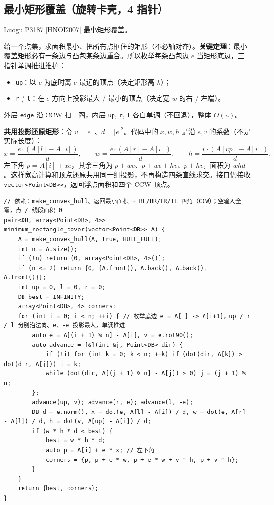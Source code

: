 		\subsection{最小矩形覆盖（旋转卡壳，4 指针）}

		\href{https://vjudge.net/problem/Luogu-P3187}{Luogu P3187 [HNOI2007] 最小矩形覆盖}。

		给一个点集，求面积最小、把所有点框住的矩形（不必轴对齐）。\textbf{关键定理}：最小覆盖矩形必有一条边与凸包某条边重合。所以枚举每条凸包边 $e$ 当矩形底边，三指针单调推进维护：
		\begin{itemize}
				\setlength\itemsep{0pt}
			\item \texttt{up}：以 $e$ 为底时离 $e$ 最远的顶点（决定矩形高 $h$）；
			\item \texttt{r} / \texttt{l}：在 $e$ 方向上投影最大 / 最小的顶点（决定宽 $w$ 的右 / 左端）。
		\end{itemize}
		外层 \texttt{edge} 沿 CCW 扫一圈，内层 \texttt{up}, \texttt{r}, \texttt{l} 各自单调（不回退），整体 $O(n)$。

		\textbf{共用投影还原矩形}：令 $v=e^\perp$、$d=|e|^2$。代码中的 $x,w,h$ 是沿 $e,v$ 的系数（不是实际长度）：
		\[
		 x=\frac{e\cdot(A[l]-A[i])}{d},\qquad
		 w=\frac{e\cdot(A[r]-A[l])}{d},\qquad
		 h=\frac{v\cdot(A[up]-A[i])}{d}.
		\]
		左下角 $p=A[i]+xe$，其余三角为 $p+we$、$p+we+hv$、$p+hv$，面积为 $whd$。这样宽高计算和顶点还原共用同一组投影，不再构造四条直线求交。接口仍接收 \texttt{vector<Point<DB>>}，返回浮点面积和四个 CCW 顶点。

\begin{verbatim}
// 依赖：make_convex_hull。返回最小面积 + BL/BR/TR/TL 四角（CCW）；空输入全零，点 / 线段面积 0
pair<DB, array<Point<DB>, 4>> minimum_rectangle_cover(vector<Point<DB>> A) {
	A = make_convex_hull(A, true, HULL_FULL);
	int n = A.size();
	if (!n) return {0, array<Point<DB>, 4>()};
	if (n <= 2) return {0, {A.front(), A.back(), A.back(), A.front()}};
	int up = 0, l = 0, r = 0;
	DB best = INFINITY;
	array<Point<DB>, 4> corners;
	for (int i = 0; i < n; ++i) { // 枚举底边 e = A[i] -> A[i+1]，up / r / l 分别沿法向、e、-e 投影最大，单调推进
		auto e = A[(i + 1) % n] - A[i], v = e.rot90();
		auto advance = [&](int &j, Point<DB> dir) {
			if (!i) for (int k = 0; k < n; ++k) if (dot(dir, A[k]) > dot(dir, A[j])) j = k;
			while (dot(dir, A[(j + 1) % n] - A[j]) > 0) j = (j + 1) % n;
		};
		advance(up, v); advance(r, e); advance(l, -e);
		DB d = e.norm(), x = dot(e, A[l] - A[i]) / d, w = dot(e, A[r] - A[l]) / d, h = dot(v, A[up] - A[i]) / d;
		if (w * h * d < best) {
			best = w * h * d;
			auto p = A[i] + e * x; // 左下角
			corners = {p, p + e * w, p + e * w + v * h, p + v * h};
		}
	}
	return {best, corners};
}
\end{verbatim}

